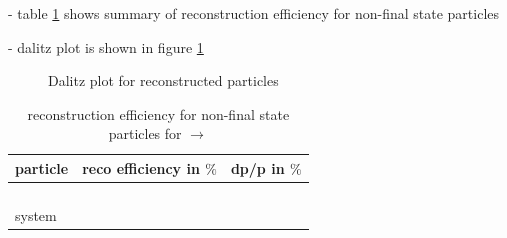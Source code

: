 	- table \ref{tab:non-finalstate_efficiency} shows summary of reconstruction efficiency for non-final state particles
	
	- dalitz plot is shown in figure \ref{fig:reco_dalitzplot}
	
	\begin{figure}
		\centering
		\caption{Dalitz plot for reconstructed particles}
		\label{fig:reco_dalitzplot}
	
	\end{figure}
	
	\begin{table}
		\caption{reconstruction efficiency for non-final state particles for \pbarpSystem $\rightarrow$ \excitedcascade \anticascade}
		\label{tab:non-finalstate_efficiency}
		
		\begin{tabular}{lcc}
		
			\hline
			particle & reco efficiency in $\%$ & dp/p in $\%$ \\\hline
			\hline
			\lam & & \\
			\alam & & \\
			\anticascade & & \\
			\excitedcascade & & \\
			\anticascade \cascade system & & \\\hline
			 	
		\end{tabular}
	\end{table}
	